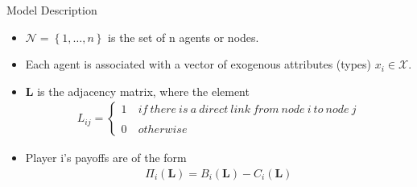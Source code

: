 \documentclass{beamer}		%
\begin{document}
\begin{frame}{Model Description}

\begin{itemize}
    \item $\mathcal{N}=\left\{ 1,\ldots,n \right\}$ is the set of n agents or nodes.
    \pause
    \item Each agent is associated with a vector of exogenous attributes (types) $x_i \in \mathcal{X}$.
    \pause
    \item $\bm{L}$ is the adjacency matrix, where the element
        \begin{align}
            L_{ij} = 
                \begin{cases}
                1\ & if\ there\ is\ a\ direct\ link\ from\ node\ i\ to\ node\ j\\
                ~\\
                0\ & otherwise
                \end{cases}
        \end{align}
    \pause
    \item Player i’s payoffs are of the form 
        \begin{align}
            \Pi_i(\bm{L}) = B_i(\bm{L}) - C_i(\bm{L})
        \end{align}
        
    
\end{itemize}


    
\end{frame}
\end{document}
